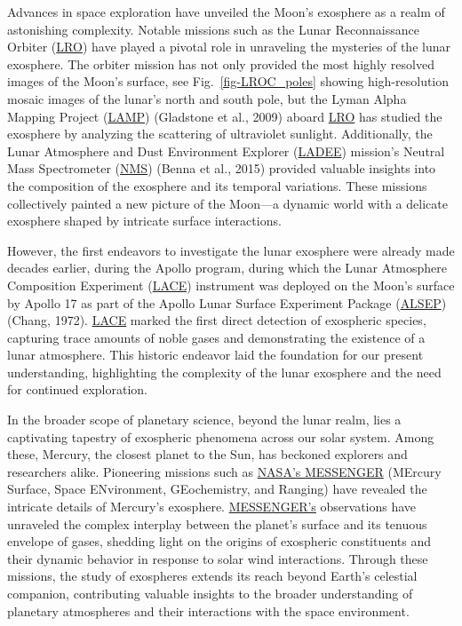 \documentclass[
  letterpaper,
  DIV=11,
  numbers=noendperiod,
  oneside]{scrartcl}
\begin{document}
Advances in space exploration have unveiled the Moon's exosphere as a
realm of astonishing complexity. Notable missions such as the Lunar
Reconnaissance Orbiter (\href{/documentation/acronyms.qmd}{LRO}) have
played a pivotal role in unraveling the mysteries of the lunar
exosphere. The orbiter mission has not only provided the most highly
resolved images of the Moon's surface, see Fig.~\ref{fig-LROC_poles}
showing high-resolution mosaic images of the lunar's north and south
pole, but the Lyman Alpha Mapping Project
(\href{/documentation/acronyms.qmd}{LAMP}) (Gladstone et al., 2009)
aboard \href{/documentation/acronyms.qmd}{LRO} has studied the exosphere
by analyzing the scattering of ultraviolet sunlight. Additionally, the
Lunar Atmosphere and Dust Environment Explorer
(\href{/documentation/acronyms.qmd}{LADEE}) mission's Neutral Mass
Spectrometer (\href{/documentation/acronyms.qmd}{NMS}) (Benna et al.,
2015) provided valuable insights into the composition of the exosphere
and its temporal variations. These missions collectively painted a new
picture of the Moon---a dynamic world with a delicate exosphere shaped
by intricate surface interactions.


However, the first endeavors to investigate the lunar exosphere were
already made decades earlier, during the Apollo program, during which
the Lunar Atmosphere Composition Experiment
(\href{/documentation/acronyms.qmd}{LACE}) instrument was deployed on
the Moon's surface by Apollo 17 as part of the Apollo Lunar Surface
Experiment Package (\href{/documentation/acronyms.qmd}{ALSEP}) (Chang,
1972). \href{/documentation/acronyms.qmd}{LACE} marked the first direct
detection of exospheric species, capturing trace amounts of noble gases
and demonstrating the existence of a lunar atmosphere. This historic
endeavor laid the foundation for our present understanding, highlighting
the complexity of the lunar exosphere and the need for continued
exploration.

In the broader scope of planetary science, beyond the lunar realm, lies
a captivating tapestry of exospheric phenomena across our solar system.
Among these, Mercury, the closest planet to the Sun, has beckoned
explorers and researchers alike. Pioneering missions such as
\href{/documentation/acronyms.qmd}{NASA's MESSENGER} (MErcury Surface,
Space ENvironment, GEochemistry, and Ranging) have revealed the
intricate details of Mercury's exosphere.
\href{/documentation/acronyms.qmd}{MESSENGER's} observations have
unraveled the complex interplay between the planet's surface and its
tenuous envelope of gases, shedding light on the origins of exospheric
constituents and their dynamic behavior in response to solar wind
interactions. Through these missions, the study of exospheres extends
its reach beyond Earth's celestial companion, contributing valuable
insights to the broader understanding of planetary atmospheres and their
interactions with the space environment.
\end{document}
